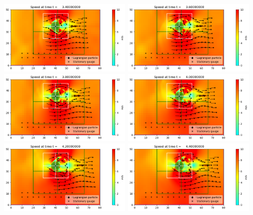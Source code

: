 \documentclass[11pt]{article}
\begin{document}
\vskip 10pt 
\includegraphics[width=0.475\textwidth]{frame0017fig0.png}
\vskip 10pt 
\includegraphics[width=0.475\textwidth]{frame0018fig0.png}
\vskip 10pt 
\includegraphics[width=0.475\textwidth]{frame0019fig0.png}
\vskip 10pt 
\includegraphics[width=0.475\textwidth]{frame0020fig0.png}
\vskip 10pt 
\includegraphics[width=0.475\textwidth]{frame0021fig0.png}
\vskip 10pt 
\includegraphics[width=0.475\textwidth]{frame0022fig0.png}
\end{document}
